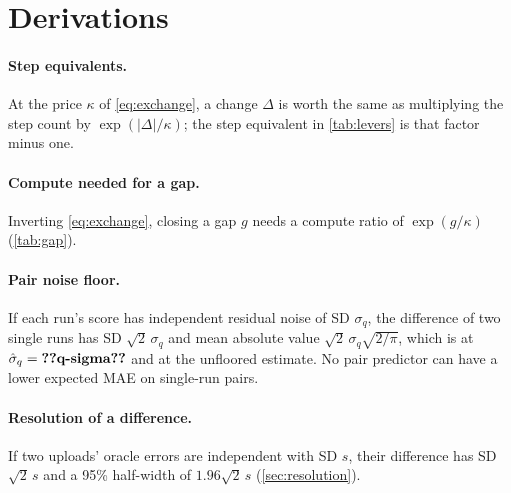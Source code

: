 \begin{table}[!htbp]
  \centering
  \caption{\textbf{Settings of the final recipe .}}
  \label{tab:hyper}
  
\end{table}

\section{Derivations}
\label{app:derivations}

\paragraph{Step equivalents.} At the price $\kappa$ of \cref{eq:exchange}, a change $\Delta$ is worth the same as
multiplying the step count by $\exp(|\Delta|/\kappa)$; the step equivalent in \cref{tab:levers} is that factor minus
one.

\paragraph{Compute needed for a gap.} Inverting \cref{eq:exchange}, closing a gap $g$ needs a compute ratio of
$\exp(g/\kappa)$ (\cref{tab:gap}).

\paragraph{Pair noise floor.} If each run's score has independent residual noise of SD $\sigma_q$, the difference of
two single runs has SD $\sqrt2\,\sigma_q$ and mean absolute value $\sqrt2\,\sigma_q\sqrt{2/\pi}$, which is
 at $\hat\sigma_q=\val{q-sigma}$ and  at the unfloored estimate. No
pair predictor can have a lower expected MAE on single-run pairs.

\paragraph{Resolution of a difference.} If two uploads' oracle errors are independent with SD $s$, their difference
has SD $\sqrt2\,s$ and a 95\% half-width of $1.96\sqrt2\,s$ (\cref{sec:resolution}).

